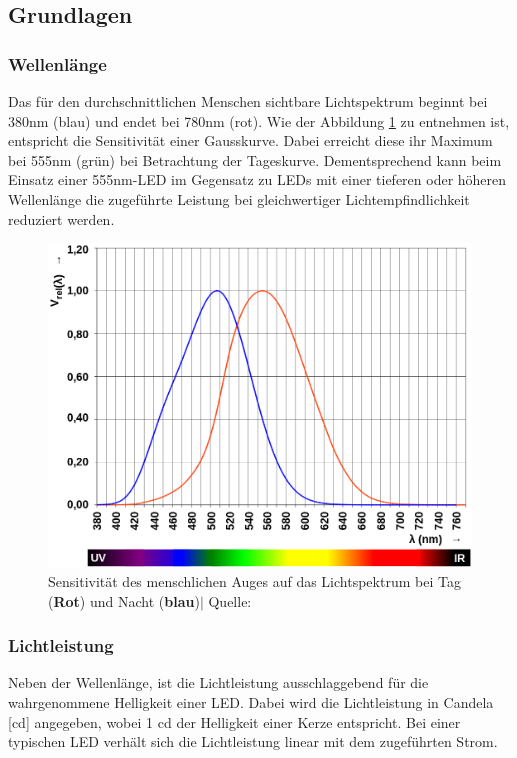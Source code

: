 \documentclass[12pt]{article}
\begin{document}
	\subsection{Grundlagen}
	\subsubsection*{Wellenlänge} \label{Wellenlänge}
	Das für den durchschnittlichen Menschen sichtbare Lichtspektrum beginnt bei 380nm (blau) und endet bei 780nm (rot)\cite{noauthor_v-lambda-kurve_2023}. Wie der Abbildung \ref{fig:batv-lambda-curve} zu entnehmen ist, entspricht die Sensitivität einer Gausskurve. Dabei erreicht diese ihr Maximum bei 555nm (grün) bei Betrachtung der Tageskurve. Dementsprechend kann beim Einsatz einer 555nm-LED im Gegensatz zu LEDs mit einer tieferen oder höheren Wellenlänge die zugeführte Leistung bei gleichwertiger Lichtempfindlichkeit reduziert werden.
	\begin{figure}[H]
		\centering
		\includegraphics[width=0.8\linewidth]{images/BAT_v-lambda-curve}
		\caption{Sensitivität des menschlichen Auges auf das Lichtspektrum bei Tag (\color{red}\textbf{Rot}\color{black}) und Nacht (\color{blue}\textbf{blau}\color{black})$\vert$ Quelle: \cite{noauthor_v-lambda-kurve_2023}}
		\label{fig:batv-lambda-curve}
	\end{figure}
	\subsubsection*{Lichtleistung}
	Neben der Wellenlänge, ist die Lichtleistung ausschlaggebend für die wahrgenommene Helligkeit einer LED. Dabei wird die Lichtleistung in Candela [cd] angegeben, wobei 1 cd der Helligkeit einer Kerze entspricht. Bei einer typischen LED verhält sich die Lichtleistung linear mit dem zugeführten Strom.
\end{document}
